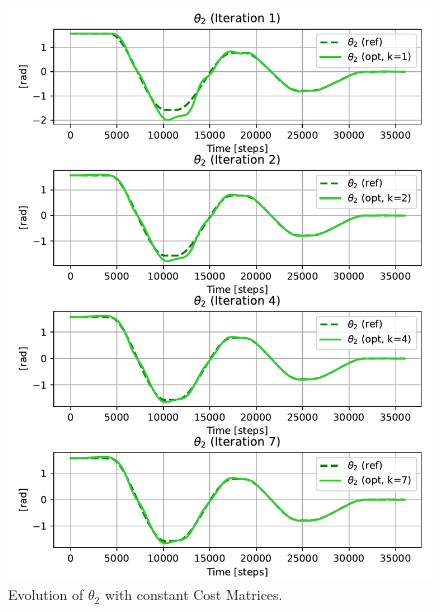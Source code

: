\begin{figure}[htb]
    \centering
    \includegraphics[width=1\linewidth]{img/2-task2/t2_const.pdf}
    \caption{Evolution of $\theta_2$ with constant Cost Matrices.}
    \label{fig:th2const_}
\end{figure}

\clearpage

